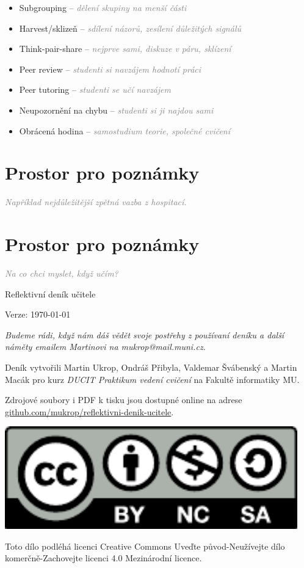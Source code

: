\documentclass[twoside,openany]{book}
\newcommand{\note}[1]{\textcolor{gray}{\small\itshape #1}}
\begin{document}
\begin{itemize}
\item Subgrouping -- \note{dělení skupiny na menší části}
\item Harvest/sklizeň -- \note{sdílení názorů, zesílení důležitých signálů}
\item Think-pair-share -- \note{nejprve sami, diskuze v páru, sklízení}
\item Peer review -- \note{studenti si navzájem hodnotí práci}
\item Peer tutoring -- \note{studenti se učí navzájem}
\item Neupozornění na chybu -- \note{studenti si ji najdou sami}
\item Obrácená hodina -- \note{samostudium teorie, společné cvičení}
\end{itemize}

\chapter*{Prostor pro poznámky}
\note{Například nejdůležitější zpětná vazba z hospitací.}

\chapter*{Prostor pro poznámky}
\note{Na co chci myslet, když učím?}

\newpage
\vspace*{\fill}
Reflektivní deník učitele

Verze: \today

\textit{Budeme rádi, když nám dáš vědět svoje postřehy z používaní deníku a další náměty emailem Martinovi na mukrop@mail.muni.cz.}

Deník vytvořili Martin Ukrop, Ondráš Přibyla, Valdemar Švábenský a Martin Macák pro kurz \textit{DUCIT Praktikum vedení cvičení} na Fakultě informatiky MU.

Zdrojové soubory i PDF k tisku jsou dostupné online na adrese \url{github.com/mukrop/reflektivni-denik-ucitele}.

\begin{minipage}{0.32\textwidth}
\includegraphics[width=0.95\textwidth]{img/cc-by-nc-sa}
\end{minipage}
\begin{minipage}{0.68\textwidth}
Toto dílo podléhá licenci Creative Commons Uveďte původ-Neužívejte dílo komerčně-Zachovejte licenci 4.0 Mezinárodní licence.
\end{minipage}

\newpage
\thispagestyle{empty}
\mbox{}
\newpage
\thispagestyle{empty}
\mbox{}
\end{document}
